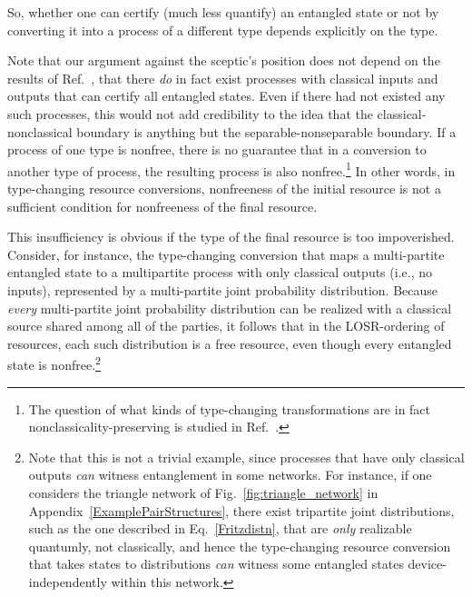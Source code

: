 \documentclass[12pt]{article}
\theoremstyle{plain}
\theoremstyle{definition}
\begin{document}
So, whether one can certify (much less quantify) an entangled state or not by converting it into a process of a different type depends explicitly on the type. 

Note that our argument against the sceptic's position does not depend on the results of Ref.~\cite{bowles2018device},
that there {\em do} in fact exist processes with classical inputs and outputs that can certify all entangled states.  Even if there had not existed any such processes, this would not add credibility to the idea that the classical-nonclassical boundary is anything but the separable-nonseparable boundary.
If a process of one type is nonfree, there is no guarantee that in a conversion to another type of process, the resulting process
 is also nonfree.\footnote{The question of what kinds of type-changing transformations are in fact nonclassicality-preserving is studied in Ref.~\cite{semiquantum,rosset2020characterizing}.}
 In other words, in type-changing resource conversions, nonfreeness of the initial resource is not a sufficient condition for nonfreeness of the final resource.  
 
This insufficiency is obvious if the type of the final resource is too impoverished.  Consider, for instance, the type-changing conversion that maps a multi-partite entangled state to a multipartite process with only classical outputs (i.e., no inputs), represented by a multi-partite joint probability distribution.  Because {\em every} multi-partite joint probability distribution can be realized with a classical source shared among all of the parties, it follows that in the LOSR-ordering of resources, 
each such distribution is a free resource, even though every entangled state is nonfree.\footnote{Note that this is not a trivial example, since processes that have only classical outputs {\em can} witness entanglement in some networks. For instance, if one considers the triangle network of Fig.~\ref{fig:triangle_network} in Appendix~\ref{ExamplePairStructures},
there exist tripartite joint distributions, such as the one described in Eq.~\eqref{Fritzdistn}, that are {\em only} realizable quantumly, not classically, and hence the type-changing resource conversion that takes states to distributions {\em can} witness some entangled states device-independently within this network.}
\end{document}
